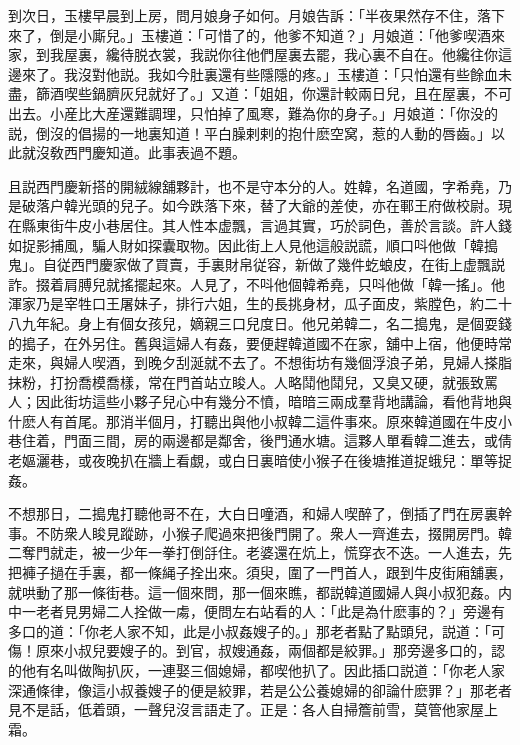 到次日，玉樓早晨到上房，問月娘身子如何。月娘告訴：「半夜果然存不住，落下來了，倒是小廝兒。」玉樓道：「可惜了的，他爹不知道？」月娘道：「他爹喫酒來家，到我屋裏，纔待脱衣裳，我説你往他們屋裏去罷，我心裏不自在。他纔往你這邊來了。我沒對他説。我如今肚裏還有些隱隱的疼。」玉樓道：「只怕還有些餘血未盡，篩酒喫些鍋臍灰兒就好了。」又道：「姐姐，你還計較兩日兒，且在屋裏，不可出去。小産比大産還難調理，只怕掉了風寒，難為你的身子。」月娘道：「你没的説，倒沒的倡揚的一地裏知道！平白臊剌剌的抱什麽空窝，惹的人動的唇齒。」以此就沒敎西門慶知道。此事表過不題。

且説西門慶新搭的開絨線舖夥計，也不是守本分的人。姓韓，名道國，字希堯，乃是破落户韓光頭的兒子。如今跌落下來，替了大爺的差使，亦在鄆王府做校尉。現在縣東街牛皮小巷居住。其人性本虚飄，言過其實，巧於詞色，善於言談。許人錢如捉影捕風，騙人財如探囊取物。因此街上人見他這般説謊，順口呌他做「韓搗鬼」。自従西門慶家做了買賣，手裏財帛従容，新做了幾件虼蜋皮，在街上虚飄説詐。掇着肩膊兒就搖擺起來。人見了，不呌他個韓希堯，只呌他做「韓一搖」。他渾家乃是宰牲口王屠妹子，排行六姐，生的長挑身材，瓜子面皮，紫膛色，約二十八九年紀。身上有個女孩兒，嫡親三口兒度日。他兄弟韓二，名二搗鬼，是個耍錢的搗子，在外另住。舊與這婦人有姦，要便趕韓道國不在家，舖中上宿，他便時常走來，與婦人喫酒，到晚夕刮涎就不去了。不想街坊有幾個浮浪子弟，見婦人搽脂抹粉，打扮喬模喬樣，常在門首站立睃人。人略鬦他鬦兒，又臭又硬，就張致罵人；因此街坊這些小夥子兒心中有幾分不憤，暗暗三兩成羣背地講論，看他背地與什麽人有首尾。那消半個月，打聽出與他小叔韓二這件事來。原來韓道國在牛皮小巷住着，門面三間，房的兩邊都是鄰舍，後門通水塘。這夥人單看韓二進去，或倩老嫗灑巷，或夜晚扒在牆上看覷，或白日裏暗使小猴子在後塘推道捉蛾兒：單等捉姦。

不想那日，二搗鬼打聽他哥不在，大白日噇酒，和婦人喫醉了，倒插了門在房裏幹事。不防衆人睃見蹤跡，小猴子爬過來把後門開了。衆人一齊進去，掇開房門。韓二奪門就走，被一少年一拳打倒㧱住。老婆還在炕上，慌穿衣不迭。一人進去，先把褲子撾在手裏，都一條䋲子拴出來。須臾，圍了一門首人，跟到牛皮街廂舖裏，就哄動了那一條街巷。這一個來問，那一個來瞧，都説韓道國婦人與小叔犯姦。内中一老者見男婦二人拴做一䖏，便問左右站看的人：「此是為什麽事的？」旁邊有多口的道：「你老人家不知，此是小叔姦嫂子的。」那老者點了點頭兒，説道：「可傷！原來小叔兒要嫂子的。到官，叔嫂通姦，兩個都是絞罪。」那旁邊多口的，認的他有名叫做陶扒灰，一連娶三個媳婦，都喫他扒了。因此插口説道：「你老人家深通條律，像這小叔養嫂子的便是絞罪，若是公公養媳婦的卻論什麽罪？」那老者見不是話，低着頭，一聲兒沒言語走了。正是：各人自掃簷前雪，莫管他家屋上霜。

